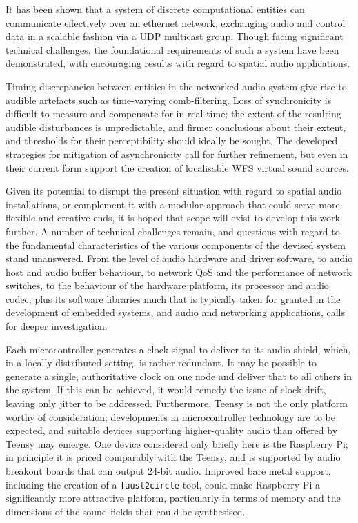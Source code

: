 \documentclass[utf8]{FrontiersinHarvard}
\begin{document}
    It has been shown that a system of discrete computational entities can
    communicate effectively over an ethernet network, exchanging audio and control
    data in a scalable fashion via a UDP multicast group.
    Though facing significant technical challenges, the foundational requirements of
    such a system have been demonstrated, with encouraging results with regard to
    spatial audio applications.

    Timing discrepancies between entities in the networked audio system give rise
    to audible artefacts such as time-varying comb-filtering.
    Loss of synchronicity is difficult to measure and compensate for in real-time;
    the extent of the resulting audible disturbances is unpredictable, and firmer
    conclusions about their extent, and thresholds for their perceptibility should
    ideally be sought.
    The developed strategies for mitigation of asynchronicity call for further
    refinement, but even in their current form support the creation of localisable
    WFS virtual sound sources.

    Given its potential to disrupt the present situation with regard to spatial
    audio installations, or complement it with a modular approach that could serve
    more flexible and creative ends, it is hoped that scope will exist to develop
    this work further.
    A number of technical challenges remain, and questions with regard to the
    fundamental characteristics of the various components of the devised system
    stand unanswered.
    From the level of audio hardware and driver software, to audio host and audio
    buffer behaviour, to network QoS and the performance of network switches, to
    the behaviour of the hardware platform, its processor and audio codec, plus its
    software libraries \textemdash{} much that is typically taken for granted in the
    development of embedded systems, and audio and networking applications, calls
    for deeper investigation.

    Each microcontroller generates a clock signal to deliver to its audio shield,
    which, in a locally distributed setting, is rather redundant.
    It may be possible to generate a single, authoritative clock on one node and
    deliver that to all others in the system.
    If this can be achieved, it would remedy the issue of clock drift, leaving only
    jitter to be addressed.
    Furthermore, Teensy is not the only platform worthy of consideration;
    developments in microcontroller technology are to be expected, and suitable
    devices supporting higher-quality audio than offered by Teensy may emerge.
    One device considered only briefly here is the Raspberry Pi;
    in principle it is priced comparably with the Teensy, and is supported by audio
    breakout boards that can output 24-bit audio.
    Improved bare metal support, including the creation of a \texttt{faust2circle}
    tool, could make Raspberry Pi a significantly more attractive platform,
    particularly in terms of memory and the dimensions of the sound fields that
    could be synthesised.
\end{document}
